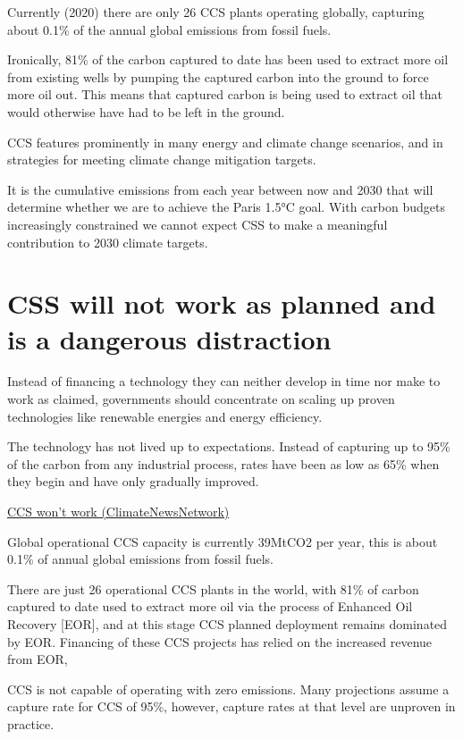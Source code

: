 \documentclass[
]{book}
\begin{document}
Currently (2020) there are only 26 CCS plants operating globally,
capturing about 0.1\% of the annual global emissions from fossil fuels.

Ironically, 81\% of the carbon captured to date has been used to
extract more oil from existing wells by pumping the captured carbon into the ground
to force more oil out.
This means that captured carbon is being used to extract oil that
would otherwise have had to be left in the ground.

CCS features prominently in many energy and climate change scenarios,
and in strategies for meeting climate change mitigation targets.

It is the cumulative emissions from each year between now and 2030 that will
determine whether we are to achieve the Paris 1.5°C goal.
With carbon budgets increasingly constrained we cannot expect
CSS to make a meaningful contribution to 2030 climate targets.

\hypertarget{css-will-not-work-as-planned-and-is-a-dangerous-distraction}{%
\section{CSS will not work as planned and is a dangerous distraction}\label{css-will-not-work-as-planned-and-is-a-dangerous-distraction}}

Instead of financing a technology they can neither develop in time
nor make to work as claimed,
governments should concentrate on scaling up proven technologies
like renewable energies and energy efficiency.

The technology has not lived up to expectations.
Instead of capturing up to 95\% of the carbon from any industrial process,
rates have been as low as 65\% when they begin and have only gradually improved.

\href{https://climatenewsnetwork.net/carbon-capture-and-storage-wont-work-critics-say/}{CCS won't work (ClimateNewsNetwork)}

Global operational CCS capacity is currently 39MtCO2 per year,
this is about 0.1\% of annual global emissions from fossil fuels.

There are just 26 operational CCS plants in the world,
with 81\% of carbon captured to date used to extract more oil
via the process of Enhanced Oil Recovery {[}EOR{]}, and at this stage
CCS planned deployment remains dominated by EOR.
Financing of these CCS projects has relied on the increased revenue from EOR,

CCS is not capable of operating with zero emissions.
Many projections assume a capture rate for CCS of 95\%, however,
capture rates at that level are unproven in practice.
\end{document}
